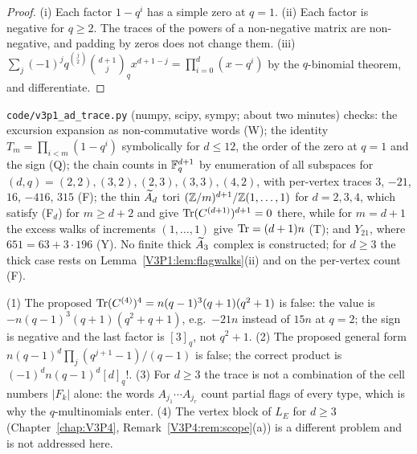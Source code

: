 \begin{proof}
(i) Each factor $1-q^{i}$ has a simple zero at $q=1$. (ii) Each factor is negative for $q\ge2$. The
traces of the powers of a non-negative matrix are non-negative, and padding by zeros does not change
them. (iii) $\sum_j(-1)^{j}q^{\binom j2}\binom{d+1}j_qx^{d+1-j}=\prod_{i=0}^{d}(x-q^{i})$ by the
$q$-binomial theorem, and differentiate.
\end{proof}

\begin{remark}\label{V3P1:rem:traceadnum}
\texttt{code/v3p1\_ad\_trace.py} (numpy, scipy, sympy; about two minutes) checks: the excursion
expansion as non-commutative words (W); the identity $T_m=\prod_{i<m}(1-q^{i})$ symbolically for
$d\le12$, the order of the zero at $q=1$ and the sign (Q); the chain counts in $\mathbb{F}_q^{d+1}$ by
enumeration of all subspaces for $(d,q)=(2,2),(3,2),(2,3),(3,3),(4,2)$, with per-vertex traces $3$,
$-21$, $16$, $-416$, $315$ (F); the thin $\widetilde A_{d}$ tori $(\mathbb{Z}/m)^{d+1}/\mathbb{Z}(1,\dots,1)$ for $d=2,3,4$, which
satisfy \textup{(F$_d$)} for $m\ge d+2$ and give $\operatorname{Tr}(C^{(d+1)})^{d+1}=0$ there, while for $m=d+1$ the
excess walks of increments $(1,\dots,1)$ give $\operatorname{Tr}=(d+1)n$ (T); and $Y_{21}$, where
$651=63+3\cdot196$ (Y). No finite thick $\widetilde A_{3}$ complex is constructed; for $d\ge3$ the thick case
rests on Lemma~\ref{V3P1:lem:flagwalks}(ii) and on the per-vertex count (F).
\end{remark}

\begin{remark}\label{V3P1:rem:traceadcorr}
(1) The proposed $\operatorname{Tr}(C^{(4)})^{4}=n(q-1)^{3}(q+1)(q^{2}+1)$ is false: the value is
$-n(q-1)^{3}(q+1)(q^{2}+q+1)$, e.g.\ $-21n$ instead of $15n$ at $q=2$; the sign is negative and the
last factor is $[3]_q$, not $q^{2}+1$. (2) The proposed general form
$n(q-1)^{d}\prod_j(q^{j+1}-1)/(q-1)$ is false; the correct product is $(-1)^{d}n(q-1)^{d}[d]_q!$. (3) For
$d\ge3$ the trace is not a combination of the cell numbers $|F_k|$ alone: the words $A_{j_1}\cdots
A_{j_r}$ count partial flags of every type, which is why the $q$-multinomials enter. (4) The vertex
block of $L_E$ for $d\ge3$ (Chapter~\ref{chap:V3P4}, Remark~\ref{V3P4:rem:scope}(a)) is a different problem and is not
addressed here.
\end{remark}
